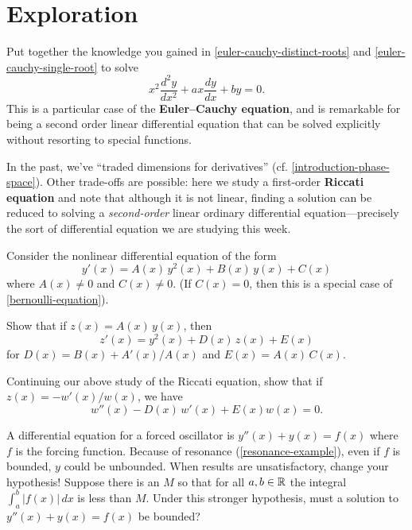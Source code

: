 \documentclass{homework}
\begin{document}
\section{Exploration}

\begin{problem}Put together the knowledge you gained in \ref{euler-cauchy-distinct-roots} and \ref{euler-cauchy-single-root} to solve
  \[
    x^{2}{\frac {d^{2}y}{dx^{2}}}+ax{\frac {dy}{dx}}+by=0.
  \]
  This is a particular case of the \textbf{Euler--Cauchy equation},
  and is remarkable for being a second order linear differential
  equation that can be solved explicitly without resorting to special
  functions.
\end{problem}

\begin{problem}\label{riccati-equation}In the past, we've ``traded dimensions for derivatives'' (cf. \ref{introduction-phase-space}).  Other trade-offs are
  possible: here we study a first-order \textbf{Riccati equation} and
  note that although it is not linear, finding a solution can be
  reduced to solving a \textit{second-order} linear ordinary
  differential equation---precisely the sort of differential equation
  we are studying this week.

  Consider the nonlinear differential equation of the form
  \[
    y'(x)=A(x)\,y^{2}(x) + B(x)\,y(x) + C(x)
  \]
  where $A(x) \neq 0$ and $C(x) \neq 0$.  (If $C(x) = 0$, then this is
  a special case of \ref{bernoulli-equation}).

  Show that if $z(x) = A(x) \, y(x)$, then
  \[
    z'(x)=y^{2}(x) + D(x)\,z(x) + E(x)
  \]
  for $D(x) = B(x) + A'(x)/A(x)$ and $E(x) = A(x) \, C(x)$.
\end{problem}
  
\begin{problem}\label{more-ricatti}Continuing our above study of the Riccati equation,
  show that if $z(x) = -w'(x)/w(x)$, we have
  \[
    w''(x) - D(x) \, w'(x) + E(x) w(x) = 0.
  \]
\end{problem}

\begin{problem}
  A differential equation for a forced oscillator is
  $y''(x) + y(x) = f(x)$ where $f$ is the forcing function.  Because
  of resonance (\ref{resonance-example}), even if $f$ is bounded, $y$
  could be unbounded.  When results are unsatisfactory, change your
  hypothesis!  Suppose there is an $M$ so that for all $a, b \in \mathbb{R}$
  the integral $\int_a^b \left|f(x)\right| \, dx$ is less than $M$.
  Under this stronger hypothesis, must a solution to
  $y''(x) + y(x) = f(x)$ be bounded?
\end{problem}
\end{document}
